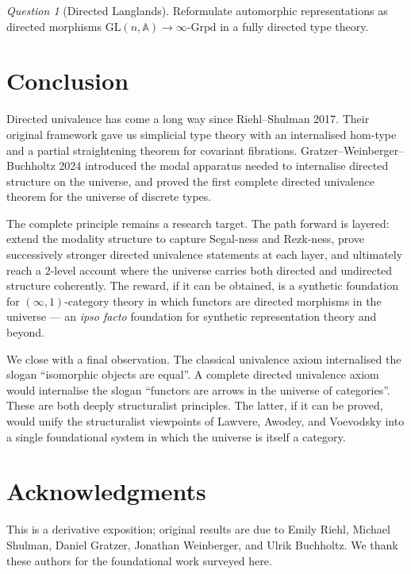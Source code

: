 \documentclass[12pt]{article}
\theoremstyle{definition}
\theoremstyle{remark}
\newtheorem{question}[theorem]{Question}
\begin{document}
\begin{question}[Directed Langlands]\label{q:langlands}
Reformulate automorphic representations as directed morphisms $\mathrm{GL}(n, \mathbb{A}) \to \infty\text{-Grpd}$ in a fully directed type theory.
\end{question}

\section{Conclusion}\label{sec:conclusion}

Directed univalence has come a long way since Riehl--Shulman 2017. Their original framework gave us simplicial type theory with an internalised hom-type and a partial straightening theorem for covariant fibrations. Gratzer--Weinberger--Buchholtz 2024 introduced the modal apparatus needed to internalise directed structure on the universe, and proved the first complete directed univalence theorem for the universe of discrete types.

The complete principle remains a research target. The path forward is layered: extend the modality structure to capture Segal-ness and Rezk-ness, prove successively stronger directed univalence statements at each layer, and ultimately reach a 2-level account where the universe carries both directed and undirected structure coherently. The reward, if it can be obtained, is a synthetic foundation for $(\infty,1)$-category theory in which functors are directed morphisms in the universe --- an \emph{ipso facto} foundation for synthetic representation theory and beyond.

We close with a final observation. The classical univalence axiom internalised the slogan ``isomorphic objects are equal''. A complete directed univalence axiom would internalise the slogan ``functors are arrows in the universe of categories''. These are both deeply structuralist principles. The latter, if it can be proved, would unify the structuralist viewpoints of Lawvere, Awodey, and Voevodsky into a single foundational system in which the universe is itself a category.

\bigskip

\section*{Acknowledgments}

This is a derivative exposition; original results are due to Emily Riehl, Michael Shulman, Daniel Gratzer, Jonathan Weinberger, and Ulrik Buchholtz. We thank these authors for the foundational work surveyed here.
\end{document}
